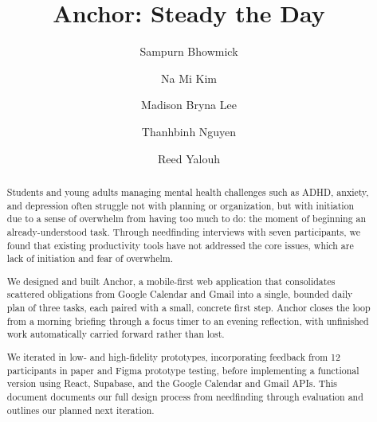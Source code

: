 \documentclass[sigplan,screen]{acmart}
\begin{document}
\title{Anchor: Steady the Day}

\author{Sampurn Bhowmick}

\author{Na Mi Kim}

\author{Madison Bryna Lee}

\author{Thanhbinh Nguyen}

\author{Reed Yalouh}

\renewcommand{\shortauthors}{Bhowmick et al.}

\begin{abstract}
Students and young adults managing mental health challenges such as ADHD, anxiety, and depression often struggle not with planning or organization, but with initiation due to a sense of overwhelm from having too much to do: the moment of beginning an already-understood task. Through needfinding interviews with seven participants, we found that existing productivity tools have not addressed the core issues, which are lack of initiation and fear of overwhelm.

We designed and built Anchor, a mobile-first web application that consolidates scattered obligations from Google Calendar and Gmail into a single, bounded daily plan of three tasks, each paired with a small, concrete first step. Anchor closes the loop from a morning briefing through a focus timer to an evening reflection, with unfinished work automatically carried forward rather than lost.

We iterated in low- and high-fidelity prototypes, incorporating feedback from 12 participants in paper and Figma prototype testing, before implementing a functional version using React, Supabase, and the Google Calendar and Gmail APIs. This document documents our full design process from needfinding through evaluation and outlines our planned next iteration.
\end{abstract}
\end{document}
